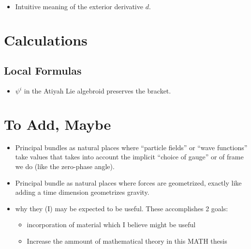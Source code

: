 \begin{itemize}
    \item Intuitive meaning of the exterior derivative $d$.
\end{itemize}

\section{Calculations}

\subsection{Local Formulas}
\begin{itemize}
    \item $\psi^i$ in the Atiyah Lie algebroid preserves the bracket.
\end{itemize}

\section{To Add, Maybe}
\begin{itemize}
    \item Principal bundles as natural places where ``particle fields'' or ``wave functions'' take values that takes into account the implicit ``choice of gauge'' or of frame we do (like the zero-phase angle).
    
    \item Principal bundle as natural places where forces are geometrized, exactly like adding a time dimension geometrizes gravity. 
    
    \item {} why they (I) may be expected to be useful. These accomplishes 2 goals: 
        \begin{itemize}
        \item incorporation of material which I believe might be useful
        \item Increase the ammount of mathematical theory in this MATH thesis
        \end{itemize}
\end{itemize}